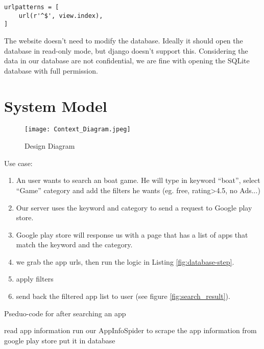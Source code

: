 \documentclass[12pt, a4paper]{article}
\begin{document}
\begin{lstlisting}[frame=tb, caption=urls.py, label=lst:pattern-matching]
urlpatterns = [
    url(r'^$', view.index),
]
\end{lstlisting}

The website doesn't need to modify the database. Ideally it should open the database in read-only mode, but django doesn't support this. Considering the data in our database are not confidential, we are fine with opening the SQLite database with full permission.

\section{System Model}

\begin{figure}[ht]
\centering
\texttt{[image: Context\_Diagram.jpeg]}
\caption{Design Diagram}
\label{fig:design_diagram}
\end{figure}



Use case:

\begin{enumerate}
    \item An user wants to search an boat game. He will type in keyword “boat”, select “Game” category and add the filters he wants (eg. free, rating>4.5, no Ads...)
    \item Our server uses the keyword and category to send a request to Google play store.
    \item Google play store will response us with a page that has a list of apps that match the keyword and the category. 
    \item we grab the app urls, then run the logic in Listing \ref{fig:database-step}.
    \item apply filters
    \item send back the filtered app list to user (see figure  \ref{fig:search_result}).
\end{enumerate}

\begin{algorithm}
    \caption{Pseduo-code for after searching an app}
    \label{fig:database-step}
\begin{algorithmic}
    \STATE read app information
    \ELSE
    \STATE run our AppInfoSpider to scrape the app information from google play store
    \STATE put it in database
    \ENDIF
    \ENDFOR
\end{algorithmic}
\end{algorithm}
    
\end{document}
